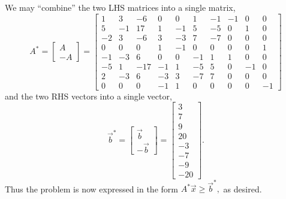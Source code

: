 \documentclass{article}
\begin{document}
\begin{itemize}
\begin{enumerate}[a)]
\begin{soln}
				We may ``combine'' the two LHS matrices into a single matrix, 
				\[A^*=\begin{bmatrix}
					A \\ -A
				\end{bmatrix} = 
				\begin{bmatrix}
					1 & 3 & -6 & 0 & 0 & 1 & -1 & -1 & 0 & 0 \\
					5 & -1 & 17 & 1 & -1 & 5 & -5 & 0 & 1 & 0 \\
					-2 & 3 & -6 & 3 & -3 & 7 & -7 & 0 & 0 & 0 \\
					0 & 0 & 0 & 1 & -1 & 0 & 0 & 0 & 0 & 1 \\
					-1 & -3 & 6 & 0 & 0 & -1 & 1 & 1 & 0 & 0 \\
					-5 & 1 & -17 & -1 & 1 & -5 & 5 & 0 & -1 & 0 \\
					2 & -3 & 6 & -3 & 3 & -7 & 7 & 0 & 0 & 0 \\
					0 & 0 & 0 & -1 & 1 & 0 & 0 & 0 & 0 & -1
				\end{bmatrix}\] and the two RHS vectors into a single vector, 
				\[\vec{b}^*=\begin{bmatrix}
					\vec{b} \\ -\vec{b}
				\end{bmatrix} = 
				\begin{bmatrix}
					3 \\ 7 \\ 9 \\ 20 \\ -3 \\ -7 \\ -9 \\ -20
			\end{bmatrix}.\] Thus the problem is now expressed in the form $A^*\vec{x}\ge\vec{b}^*,$ as desired.
			\end{soln}
			
		\end{enumerate}

	
		\newpage
	

\end{itemize}
\end{document}
